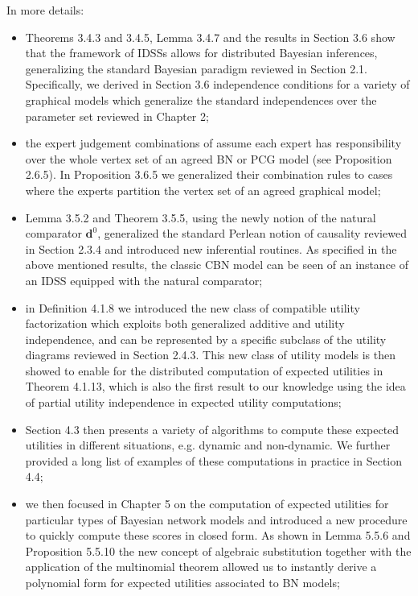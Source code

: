 In more details:
\begin{itemize}
\item Theorems 3.4.3 and 3.4.5, Lemma 3.4.7 and the results in Section 3.6 show that the framework of IDSSs allows for distributed Bayesian inferences, generalizing the standard Bayesian paradigm reviewed in Section 2.1. Specifically, we derived in Section 3.6 independence conditions for a variety of graphical models which generalize the standard independences over the parameter set reviewed in Chapter 2;
\item the expert judgement combinations of \citet{Faria1997} assume each expert has responsibility over the whole vertex set of an agreed BN or PCG model (see Proposition 2.6.5). In Proposition 3.6.5 we generalized their combination rules to cases where the experts partition the vertex set of an agreed graphical model;
\item Lemma 3.5.2 and Theorem 3.5.5, using the newly notion of the natural comparator $\bm{d}^0$, generalized the standard Perlean notion of causality reviewed in Section 2.3.4 and introduced new inferential routines. As specified in the above mentioned results, the classic CBN model can be seen of an instance of an IDSS equipped with the natural comparator;
\item in Definition 4.1.8 we introduced the new class of compatible utility factorization which exploits both generalized additive and utility independence, and can be represented by a specific subclass of the utility diagrams reviewed in Section 2.4.3. This new class of utility models is then showed to enable for the distributed computation of expected utilities in Theorem 4.1.13, which is also the first result to our knowledge using the idea of partial utility independence in expected utility computations;
\item Section 4.3 then presents a variety of algorithms to compute these expected utilities in different situations, e.g. dynamic and non-dynamic. We further provided a long list of examples of these computations in practice in Section 4.4;
\item we then focused in Chapter 5 on the computation of expected utilities for particular types of Bayesian network models and introduced a new procedure to quickly compute these scores in closed form. As shown in Lemma 5.5.6 and Proposition 5.5.10 the new concept of algebraic substitution together with the application of the multinomial theorem allowed us to instantly derive a polynomial form for expected utilities associated to BN models;

\end{itemize}
